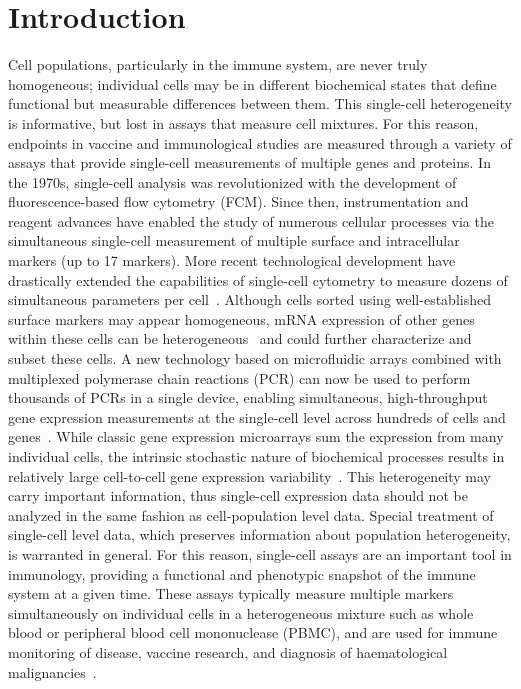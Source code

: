 \documentclass[useAMS,referee,usenatbib]{biom}
\begin{document}
\section{Introduction}
\label{s:intro}
Cell populations, particularly in the immune system, are never truly homogeneous; individual cells may be in different biochemical states that define functional but measurable differences between them. 
This single-cell heterogeneity is informative, but lost in assays that measure cell mixtures. 
For this reason, endpoints in vaccine and immunological studies are measured through a variety of assays that provide single-cell measurements of multiple genes and proteins. 
In the 1970s, single-cell analysis was revolutionized with the development of fluorescence-based flow cytometry (FCM). 
Since then, instrumentation and reagent advances have enabled the study of numerous cellular processes via the simultaneous single-cell measurement of multiple surface and intracellular markers (up to 17 markers). 
More recent technological development have drastically extended the capabilities of single-cell cytometry to measure dozens of simultaneous parameters per cell~\citep{Bendall:2011wf}. 
Although cells sorted using well-established surface markers may appear homogeneous, mRNA expression of other genes within these cells can be heterogeneous~\citep{Narsinh:2011gn, Flatz:2011jb} and could further characterize and subset these cells. 
A new technology based on microfluidic arrays combined with multiplexed polymerase chain reactions (PCR) can now be used to perform thousands of PCRs in a single device, enabling simultaneous, high-throughput gene expression measurements at the single-cell level across hundreds of cells and genes~\citep{Pieprzyk:2009uc}. 
While classic gene expression microarrays sum the expression from many individual cells, the intrinsic stochastic nature of biochemical processes results in relatively large cell-to-cell gene expression variability~\citep{vanOudenaarden200915a}. 
This heterogeneity may carry important information, thus single-cell expression data should not be analyzed in the same fashion as cell-population level data. 
Special treatment of single-cell level data, which preserves information about population heterogeneity, is warranted in general. 
For this reason, single-cell assays are an important tool in immunology, providing a functional and phenotypic snapshot of the immune system at a given time. 
These assays typically measure multiple markers simultaneously on individual cells in a heterogeneous mixture such as whole blood or peripheral blood cell mononuclease (PBMC), and are used for immune monitoring of disease, vaccine research, and diagnosis of haematological malignancies~\citep{Altman:1996wf,Betts:2006dw,Inokuma:2007tn}.
\end{document}
